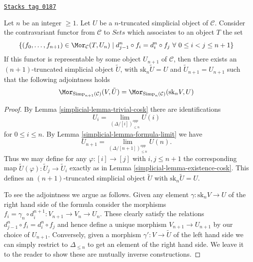 \begin{lemma}
\label{simplicial-lemma-work-out}
\href{https://stacks.math.columbia.edu/tag/0187}{\texttt{Stacks tag 0187}}

Let $n$ be an integer $\geq 1$. Let $U$ be a $n$-truncated
simplicial object of $\mathcal{C}$. Consider the
contravariant functor from $\mathcal{C}$ to $\textit{Sets}$
which associates to an object $T$ the set
$$
\{ (f_0, \ldots, f_{n + 1}) \in \Mor_\mathcal{C}(T, U_n)
\mid
d^n_{j - 1} \circ f_i = d^n_i \circ f_j
\ \forall\ 0\leq i < j\leq n + 1\}
$$
If this functor is representable by some object $U_{n + 1}$
of $\mathcal{C}$, then there exists an $(n + 1)$-truncated
simplicial object $\tilde U$, with $\text{sk}_n \tilde U = U$
and $\tilde U_{n + 1} = U_{n + 1}$ such that the following
adjointness holds
$$
\Mor_{\text{Simp}_{n + 1}(\mathcal{C})}(V, \tilde U)
=
\Mor_{\text{Simp}_n(\mathcal{C})}(\text{sk}_nV, U)
$$
\end{lemma}

\begin{proof}

By Lemma \ref{simplicial-lemma-trivial-cosk} there are identifications
$$
U_i = \lim_{(\Delta/[i])_{\leq n}^{opp}} U(i)
$$
for $0 \leq i \leq n$. By Lemma \ref{simplicial-lemma-formula-limit}
we have
$$
U_{n + 1} = \lim_{(\Delta/[n + 1])_{\leq n}^{opp}} U(n).
$$
Thus we may define for any $\varphi : [i] \to [j]$
with $i, j \leq n + 1$ the corresponding map
$\tilde U(\varphi) : \tilde U_j \to \tilde U_i$ exactly as
in Lemma \ref{simplicial-lemma-existence-cosk}. This defines
an $(n + 1)$-truncated simplicial object $\tilde U$
with $\text{sk}_n \tilde U = U$.

\medskip\noindent
To see the adjointness we argue as follows. Given any element
$\gamma : \text{sk}_n V \to U$ of the right hand side of the formula
consider the morphisms
$f_i = \gamma_n \circ d^{n + 1}_i : V_{n + 1} \to V_n \to U_n$.
These clearly satisfy the relations $d^n_{j - 1} \circ f_i = d^n_i \circ f_j$
and hence define a unique morphism $V_{n + 1} \to U_{n + 1}$
by our choice of $U_{n + 1}$.
Conversely, given a morphism $\gamma' : V \to \tilde U$
of the left hand side we can simply restrict to
$\Delta_{\leq n}$ to get an element of the right hand side.
We leave it to the reader to show these are mutually inverse
constructions.
\end{proof}

